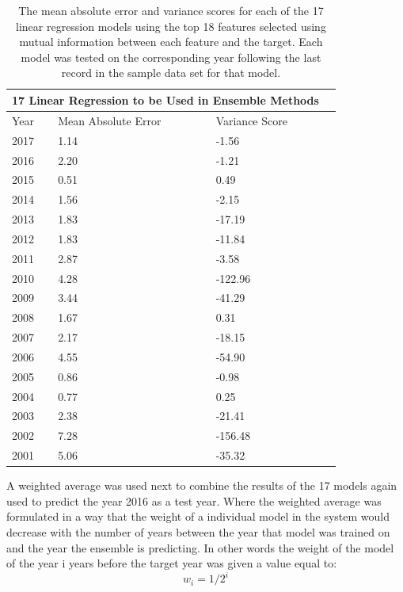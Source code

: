 \documentclass[12pt]{dalthesis}
\begin{document}
\begin{table}
	\caption{The mean absolute error and variance scores for each of the 17 linear regression models using the top 18 features selected using mutual information between each feature and the target. Each model was tested on the corresponding year following the last record in the sample data set for that model.}
	\label{tab:17years}
    \begin{tabular}{ |p{4cm}||p{4cm}|p{4cm}|p{4cm}|  }
       \hline
       \multicolumn{3}{|c|}{17 Linear Regression to be Used in Ensemble Methods } \\
       \hline
       Year    & Mean Absolute Error    & Variance Score\\
       \hline
       2017    & 1.14    & -1.56\\
       2016    & 2.20    & -1.21\\
       2015    & 0.51    & 0.49\\
       2014    & 1.56    & -2.15\\
       2013    & 1.83    & -17.19\\
       2012    & 1.83    & -11.84\\
       2011    & 2.87    & -3.58\\
       2010    & 4.28    & -122.96\\
       2009    & 3.44    & -41.29\\
       2008    & 1.67    & 0.31\\
       2007    & 2.17    & -18.15\\
       2006    & 4.55    & -54.90\\
       2005    & 0.86    & -0.98\\
       2004    & 0.77    & 0.25\\
       2003    & 2.38    & -21.41\\
       2002    & 7.28    & -156.48\\
       2001    & 5.06    & -35.32\\
       \hline
    \end{tabular}
\end{table} 


A weighted average was used next to combine the results of the 17 models again used to predict the year 2016 as a test year. Where the weighted average was formulated in a way that the weight of a individual model in the system would decrease with the number of years between the year that model was trained on and the year the ensemble is predicting. In other words the weight of the model of the year i years before the target year was given a value equal to:
\[ w_i = 1/2^i \]
\end{document}
